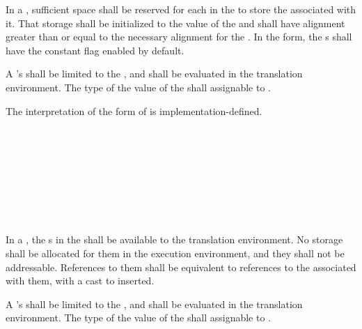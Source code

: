 \specsubsubitem
In a , sufficient space shall be reserved for
each  in the  to store
the  associated with it. That storage shall be initialized to
the value of the  and shall have alignment greater than
or equal to the necessary alignment for the . In the
 form, the s shall have the constant flag
enabled by default.

\specsubsubitem
A 's  shall be limited to
the , and shall be evaluated
in the translation environment. The type of the value of the
 shall assignable to .

\specsubsubitem
The interpretation of the  form of  is
implementation-defined.


\begin{grammar}
 \\
	  \\

 \\
	 \optional{\terminal{,}} \\
	 \terminal{,}  \\

 \\
	 \terminal{:}  \terminal{=}  \\
\end{grammar}

\specsubsubitem
In a , the s in the
 shall be available to the translation
environment. No storage shall be allocated for them in the execution
environment, and they shall not be addressable. References to them shall be
equivalent to references to the  associated with them,
with a cast to  inserted.

\specsubsubitem
A 's  shall be limited to
the , and shall be evaluated
in the translation environment. The type of the value of the
 shall assignable to .

